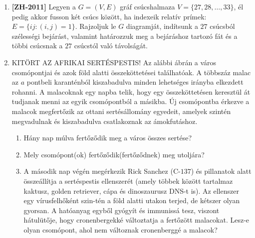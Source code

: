 \documentclass[a4paper,12pt]{article}
\begin{document}
\begin{enumerate}
        \item \label{feladat:zh2011} \textbf{[ZH-2011]} Legyen a $G=(V, E)$ gráf csúcshalmaza $V = \{27,28,\ldots,33\}$, él pedig akkor fusson két csúcs között, ha indexeik relatív prímek: $E = \{ij:(i,j) = 1\}$. Rajzoljuk le $G$ diagramját, indítsunk a $27$ csúcsból szélességi bejárást, valamint határozzuk meg a bejáráshoz tartozó fát és a többi csúcsnak a $27$ csúcstól való távolságát.

        \item KITÖRT AZ AFRIKAI SERTÉSPESTIS! Az alábbi ábrán a város csomópontjai és azok föld alatti összeköttetései találhatóak. A többszáz malac az $a$ pontbeli karanténból kiszabadulva minden lehetséges irányba elkezdett rohanni. A malacoknak egy napba telik, hogy egy összeköttetésen keresztül át tudjanak menni az egyik csomópontból a másikba. Új csomópontba érkezve a malacok megfertőzik az ottani sertésállomány egyedeit, amelyek szintén megvadulnak és kiszabadulva csatlakoznak az ámokfutáshoz.
        
        \begin{minipage}{0.6\textwidth}
            \begin{enumerate}
                \item Hány nap múlva fertőződik meg a város összes sertése?
                \item Mely csomópont(ok) fertőződik(fertőződnek) meg utoljára?
                \item A második nap végén megérkezik Rick Sanchez (C-$137$) és pillanatok alatt összeállítja a sertéspestis ellenszerét (amely többek között tartalmaz kaktusz, golden retriever, cápa és dinoszaurusz DNS-t is). Az ellenszer egy vírusfelhőként szin-tén a föld alatti utakon terjed, de kétszer olyan gyorsan. A hatóanyag egyből gyógyít és immunissá tesz, viszont hátulütője, hogy cronenbergekké változtatja a fertőzött malacokat. Lesz-e olyan csomópont, ahol nem változnak cronenberggé a malacok?
            \end{enumerate}
        \end{minipage}
        \begin{minipage}{0.3\textwidth}
            \centering
            
        \end{minipage}



\end{enumerate}
\end{document}

